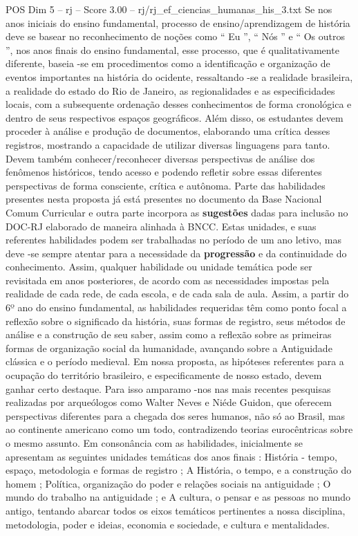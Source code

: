 \begin{textsample}{POS Dim 5 – rj – Score 3.00 – rj/rj\_ef\_ciencias\_humanas\_his\_3.txt}
Se nos anos iniciais do ensino fundamental, processo de ensino/aprendizagem de história deve se basear no reconhecimento de noções como “ Eu ”, “ Nós ” e “ Os outros ”, nos anos finais do ensino fundamental, esse processo, que é qualitativamente diferente, baseia -se em procedimentos como a identificação e organização de eventos importantes na história do ocidente, ressaltando -se a realidade brasileira, a realidade do estado do Rio de Janeiro, as regionalidades e as especificidades locais, com a subsequente ordenação desses conhecimentos de forma cronológica e dentro de seus respectivos espaços geográficos.
Além disso, os estudantes devem proceder à análise e produção de documentos, elaborando uma crítica desses registros, mostrando a capacidade de utilizar diversas linguagens para tanto.
Devem também conhecer/reconhecer diversas perspectivas de análise dos fenômenos históricos, tendo acesso e podendo refletir sobre essas diferentes perspectivas de forma consciente, crítica e autônoma.
Parte das habilidades presentes nesta proposta já está presentes no documento da Base Nacional Comum Curricular e outra parte incorpora as \textbf{sugestões} dadas para inclusão no DOC-RJ elaborado de maneira alinhada à BNCC.
Estas unidades, e suas referentes habilidades podem ser trabalhadas no período de um ano letivo, mas deve -se sempre atentar para a necessidade da \textbf{progressão} e da continuidade do conhecimento.
Assim, qualquer habilidade ou unidade temática pode ser revisitada em anos posteriores, de acordo com as necessidades impostas pela realidade de cada rede, de cada escola, e de cada sala de aula.
Assim, a partir do 6º ano do ensino fundamental, as habilidades requeridas têm como ponto focal a reflexão sobre o significado da história, suas formas de registro, seus métodos de análise e a construção de seu saber, assim como a reflexão sobre as primeiras formas de organização social da humanidade, avançando sobre a Antiguidade clássica e o período medieval.
Em nossa proposta, as hipóteses referentes para a ocupação do território brasileiro, e especificamente de nosso estado, devem ganhar certo destaque.
Para isso amparamo -nos nas mais recentes pesquisas realizadas por arqueólogos como Walter Neves e Niéde Guidon, que oferecem perspectivas diferentes para a chegada dos seres humanos, não só ao Brasil, mas ao continente americano como um todo, contradizendo teorias eurocêntricas sobre o mesmo assunto.
Em consonância com as habilidades, inicialmente se apresentam as seguintes unidades temáticas dos anos finais : História - tempo, espaço, metodologia e formas de registro ; A História, o tempo, e a construção do homem ; Política, organização do poder e relações sociais na antiguidade ; O mundo do trabalho na antiguidade ; e A cultura, o pensar e as pessoas no mundo antigo, tentando abarcar todos os eixos temáticos pertinentes a nossa disciplina, metodologia, poder e ideias, economia e sociedade, e cultura e mentalidades.

\end{textsample}
